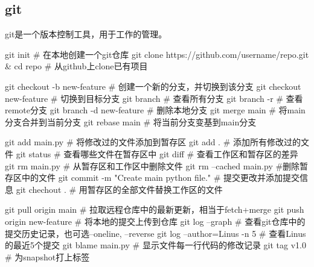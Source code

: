   \subsection{git}
    git是一个版本控制工具，用于工作的管理。
    \begin{codeblock}[language=bash, caption={git command}]
      git init # 在本地创建一个git仓库
      git clone https://github.com/username/repo.git & cd repo # 从github上clone已有项目

      git checkout -b new-feature # 创建一个新的分支，并切换到该分支
      git checkout new-feature # 切换到目标分支
      git branch # 查看所有分支
      git branch -r # 查看remote分支
      git branch -d new-feature # 删除本地分支
      git merge main # 将main分支合并到当前分支
      git rebase main # 将当前分支变基到main分支

      git add main.py # 将修改过的文件添加到暂存区
      git add . # 添加所有修改过的文件
      git status # 查看哪些文件在暂存区中
      git diff # 查看工作区和暂存区的差异
      git rm main.py # 从暂存区和工作区中删除文件
      git rm --cached main.py #删除暂存区中的文件
      git commit -m "Create main python file." # 提交更改并添加提交信息
      git chechout . # 用暂存区的全部文件替换工作区的文件

      git pull origin main # 拉取远程仓库中的最新更新，相当于fetch+merge
      git push origin new-feature # 将本地的提交上传到仓库
      git log --graph # 查看git仓库中的提交历史记录，也可选--oneline, --reverse
      git log --author=Linus -n 5 # 查看Linus的最近5个提交
      git blame main.py # 显示文件每一行代码的修改记录
      git tag v1.0 # 为snapshot打上标签
    \end{codeblock}
